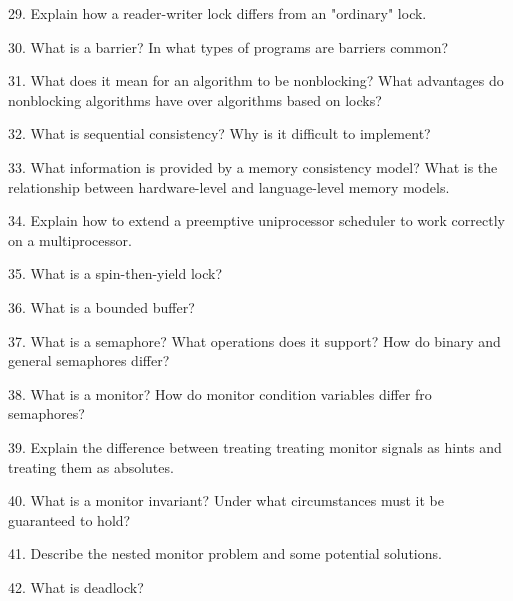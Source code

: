\filbreak
\vskip 1cm

29. Explain how a reader-writer lock differs from an "ordinary" lock.

\filbreak
\vskip 1cm

30. What is a barrier? In what types of programs are barriers common?

\filbreak
\vskip 1cm

31. What does it mean for an algorithm to be nonblocking? What advantages do nonblocking algorithms have over algorithms based on locks?

\filbreak
\vskip 1cm

32. What is sequential consistency? Why is it difficult to implement?

\filbreak
\vskip 1cm

33. What information is provided by a memory consistency model? What is the relationship between hardware-level and language-level memory models.

\filbreak
\vskip 1cm

34.  Explain how to extend a preemptive uniprocessor scheduler to work correctly on a multiprocessor.

\filbreak
\vskip 1cm

35. What is a spin-then-yield lock?

\filbreak
\vskip 1cm

36. What is a bounded buffer?

\filbreak
\vskip 1cm

37. What is a semaphore? What operations does it support? How do binary and general semaphores differ?

\filbreak
\vskip 1cm

38. What is a monitor? How do monitor condition variables differ fro semaphores?

\filbreak
\vskip 1cm

39. Explain the difference between treating treating monitor signals as hints and treating them as absolutes.

\filbreak
\vskip 1cm

40. What is a monitor invariant? Under what circumstances must it be guaranteed to hold?

\filbreak
\vskip 1cm

41. Describe the nested monitor problem and some potential solutions.

\filbreak
\vskip 1cm

42. What is deadlock?

\filbreak
\vskip 1cm

